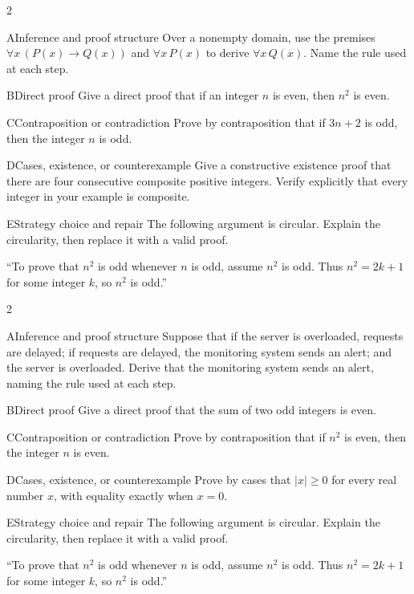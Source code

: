 \documentclass[9pt]{extarticle}
\begin{document}
\begin{multicols}{2}
\begin{CoreProblem}{A}{Inference and proof structure}
Over a nonempty domain, use the premises
$\forall x\,(P(x)\to Q(x))$ and $\forall x\,P(x)$ to derive
$\forall x\,Q(x)$. Name the rule used at each step.
\end{CoreProblem}
\begin{CoreProblem}{B}{Direct proof}
Give a direct proof that if an integer $n$ is even, then $n^2$ is even.
\end{CoreProblem}
\begin{CoreProblem}{C}{Contraposition or contradiction}
Prove by contraposition that if $3n+2$ is odd, then the integer $n$ is odd.
\end{CoreProblem}
\columnbreak
\begin{CoreProblem}{D}{Cases, existence, or counterexample}
Give a constructive existence proof that there are four consecutive composite
positive integers. Verify explicitly that every integer in your example is
composite.
\end{CoreProblem}
\begin{CoreProblem}{E}{Strategy choice and repair}
The following argument is circular. Explain the circularity, then replace it with a valid proof.

``To prove that $n^2$ is odd whenever $n$ is odd, assume $n^2$ is odd. Thus
$n^2=2k+1$ for some integer $k$, so $n^2$ is odd.''
\end{CoreProblem}
\end{multicols}
\CoreWorkArea
\FormBreak
{}
\begin{multicols}{2}
\begin{CoreProblem}{A}{Inference and proof structure}
Suppose that if the server is overloaded, requests are delayed; if requests are
delayed, the monitoring system sends an alert; and the server is overloaded.
Derive that the monitoring system sends an alert, naming the rule used at each
step.
\end{CoreProblem}
\begin{CoreProblem}{B}{Direct proof}
Give a direct proof that the sum of two odd integers is even.
\end{CoreProblem}
\begin{CoreProblem}{C}{Contraposition or contradiction}
Prove by contraposition that if $n^2$ is even, then the integer $n$ is even.
\end{CoreProblem}
\columnbreak
\begin{CoreProblem}{D}{Cases, existence, or counterexample}
Prove by cases that $|x|\ge 0$ for every real number $x$, with equality exactly when $x=0$.
\end{CoreProblem}
\begin{CoreProblem}{E}{Strategy choice and repair}
The following argument is circular. Explain the circularity, then replace it with a valid proof.

``To prove that $n^2$ is odd whenever $n$ is odd, assume $n^2$ is odd. Thus
$n^2=2k+1$ for some integer $k$, so $n^2$ is odd.''
\end{CoreProblem}
\end{multicols}
\end{document}
